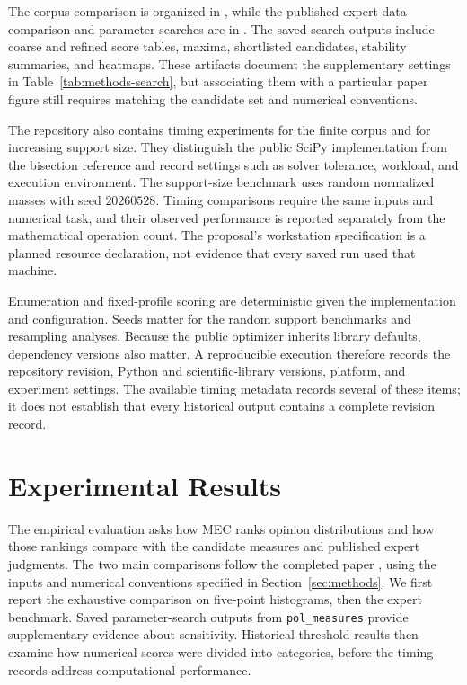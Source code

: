 \documentclass{article}
\theoremstyle{plain}
\theoremstyle{remark}
\begin{document}
The corpus comparison is organized in , while the published expert-data comparison and parameter searches are in . The saved search outputs include coarse and refined score tables, maxima, shortlisted candidates, stability summaries, and heatmaps. These artifacts document the supplementary settings in Table~\ref{tab:methods-search}, but associating them with a particular paper figure still requires matching the candidate set and numerical conventions.

The repository also contains timing experiments for the finite corpus and for increasing support size. They distinguish the public SciPy implementation from the bisection reference and record settings such as solver tolerance, workload, and execution environment. The support-size benchmark uses random normalized masses with seed $20260528$. Timing comparisons require the same inputs and numerical task, and their observed performance is reported separately from the mathematical operation count. The proposal's workstation specification is a planned resource declaration, not evidence that every saved run used that machine.

Enumeration and fixed-profile scoring are deterministic given the implementation and configuration. Seeds matter for the random support benchmarks and resampling analyses. Because the public optimizer inherits library defaults, dependency versions also matter. A reproducible execution therefore records the repository revision, Python and scientific-library versions, platform, and experiment settings. The available timing metadata records several of these items; it does not establish that every historical output contains a complete revision record.



\section{Experimental Results}\label{sec:results}

The empirical evaluation asks how MEC ranks opinion distributions and how those rankings compare with the candidate measures and published expert judgments. The two main comparisons follow the completed paper \citep{aranda2026mec}, using the inputs and numerical conventions specified in Section~\ref{sec:methods}. We first report the exhaustive comparison on five-point histograms, then the expert benchmark. Saved parameter-search outputs from \texttt{pol\_measures} provide supplementary evidence about sensitivity. Historical threshold results then examine how numerical scores were divided into categories, before the timing records address computational performance.
\end{document}
